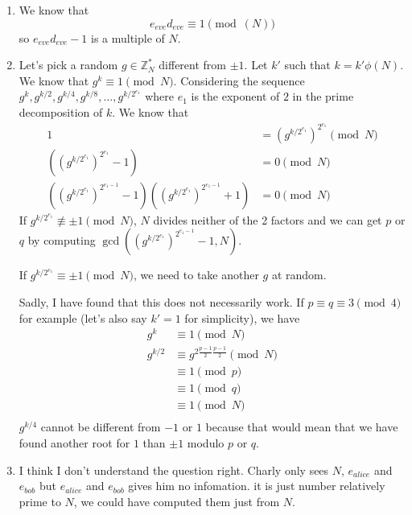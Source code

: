 \begin{solution}
	\begin{enumerate}
		\item
		We know that
		\[ e_{eve}d_{eve} \equiv 1 \pmod(N) \]
		so $e_{eve}d_{eve}-1$ is a multiple of $N$.
		\item
		Let's pick a random $g \in \mathbb{Z}_N^*$ different from $\pm 1$.
		Let $k'$ such that $k = k'\phi(N)$.
		We know that $g^k \equiv 1 \pmod{N}$.
		Considering the sequence
		$g^k, g^{k/2}, g^{k/4}, g^{k/8}, \ldots, g^{k/2^{e_1}}$
		where $e_1$ is the exponent of $2$ in the prime decomposition of $k$.
		We know that
		\begin{align*}
			1
			& = (g^{k/2^{e_1}})^{2^{e_1}} \pmod{N}\\
			((g^{k/2^{e_1}})^{2^{e_1}} - 1) & = 0 \pmod{N}\\
			((g^{k/2^{e_1}})^{2^{e_1-1}} - 1)((g^{k/2^{e_1}})^{2^{e_1-1}} + 1) & = 0 \pmod{N}
		\end{align*}
		If $g^{k/2^{e_1}} \not\equiv \pm 1 \pmod{N}$,
		$N$ divides neither of the 2 factors and we can get $p$ or $q$
		by computing $\gcd((g^{k/2^{e_1}})^{2^{e_1-1}} - 1, N)$.
		
		If $g^{k/2^{e_1}} \equiv \pm 1 \pmod{N}$,
		we need to take another $g$ at random.
		
		Sadly, I have found that this does not necessarily work.
		If $p \equiv q \equiv 3 \pmod{4}$ for example (let's also say $k' = 1$ for simplicity),
		we have
		\begin{align*}
			g^{k} & \equiv 1 \pmod{N}\\
			g^{k/2}
			& \equiv g^{2\frac{p-1}{2}\frac{p-1}{2}} \pmod{N}\\
			& \equiv 1 \pmod{p}\\
			& \equiv 1 \pmod{q}\\
			& \equiv 1 \pmod{N}\\
		\end{align*}
		$g^{k/4}$ cannot be different from $-1$ or $1$ because that would mean that
		we have found another root for $1$ than $\pm 1$ modulo $p$ or $q$.
		\item
		I think I don't understand the question right.
		Charly only sees $N$, $e_{alice}$ and $e_{bob}$
		but $e_{alice}$ and $e_{bob}$ gives him no infomation.
		it is just number relatively prime to $N$,
		we could have computed them just from $N$.
	\end{enumerate}
\end{solution}


